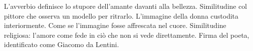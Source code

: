 \vspace{3em}

\begin{commentaries}
     L'avverbio definisce lo stupore dell'amante davanti alla bellezza.
     Similitudine col pittore che osserva un modello per ritrarlo.
     L'immagine della donna custodita interiormente.
     Come se l'immagine fosse affrescata nel cuore.
     Similitudine religiosa: l'amore come fede in ciò che non si vede direttamente.
     Firma del poeta, identificato come Giacomo da Lentini.
\end{commentaries}